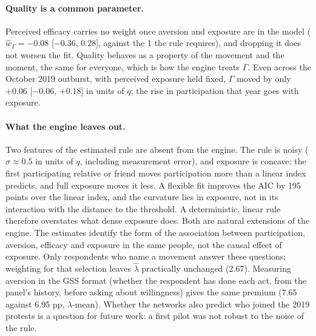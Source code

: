 \paragraph{Quality is a common parameter.} Perceived efficacy carries no weight once aversion and
exposure are in the model ($\hat w_\Gamma = -0.08$ [$-0.36$, 0.28], against the 1 the rule
requires), and dropping it does not worsen the fit. Quality behaves as a property of the movement
and the moment, the same for everyone, which is how the engine treats $\Gamma$. Even across the
October 2019 outburst, with perceived exposure held fixed, $\Gamma$ moved by only $+0.06$
[$-0.06$, $+0.18$] in units of $q$; the rise in participation that year goes with exposure.

\paragraph{What the engine leaves out.} Two features of the estimated rule are absent from the
engine. The rule is noisy ($\hat\sigma \approx 0.5$ in units of $q$, including measurement
error), and exposure is concave: the first participating relative or friend moves participation
more than a linear index predicts, and full exposure moves it less. A flexible fit improves the
AIC by 195 points over the linear index, and the curvature lies in exposure, not in its
interaction with the distance to the threshold. A deterministic, linear rule therefore
overstates what dense exposure does. Both are natural extensions of the engine. The estimates
identify the form of the association between participation, aversion, efficacy and exposure in
the same people, not the causal effect of exposure. Only respondents who name a movement answer
these questions; weighting for that selection leaves $\hat\lambda$ practically unchanged (2.67).
Measuring aversion in the GSS format (whether the respondent has done each act, from the panel's
history, before asking about willingness) gives the same premium (7.65 against 6.95 pp,
$\lambda$-mean). Whether the networks also predict who joined the 2019 protests is a question
for future work: a first pilot was not robust to the noise of the rule.

